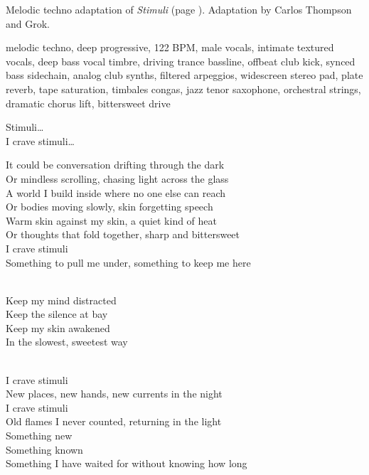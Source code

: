 
\begin{notes}
Melodic techno adaptation of \emph{Stimuli} (page \pageref{sec:stimuli}). Adaptation by Carlos Thompson and Grok.
\end{notes}
\begin{style}
melodic techno, deep progressive, 122 BPM, male vocals, intimate textured vocals, deep bass vocal timbre, driving trance bassline, offbeat club kick, synced bass sidechain, analog club synths, filtered arpeggios, widescreen stereo pad, plate reverb, tape saturation, timbales congas, jazz tenor saxophone, orchestral strings, dramatic chorus lift, bittersweet drive
\end{style}
\begin{lyrics}
Stimuli…\\
I crave stimuli…

It could be conversation drifting through the dark\\
Or mindless scrolling, chasing light across the glass\\
A world I build inside where no one else can reach\\
Or bodies moving slowly, skin forgetting speech\\
Warm skin against my skin, a quiet kind of heat\\
Or thoughts that fold together, sharp and bittersweet\\
I crave stimuli\\
Something to pull me under, something to keep me here

\\
Keep my mind distracted\\
Keep the silence at bay\\
Keep my skin awakened\\
In the slowest, sweetest way

\\
I crave stimuli\\
New places, new hands, new currents in the night\\
I crave stimuli\\
Old flames I never counted, returning in the light\\
Something new\\
Something known\\
Something I have waited for without knowing how long


\end{lyrics}
